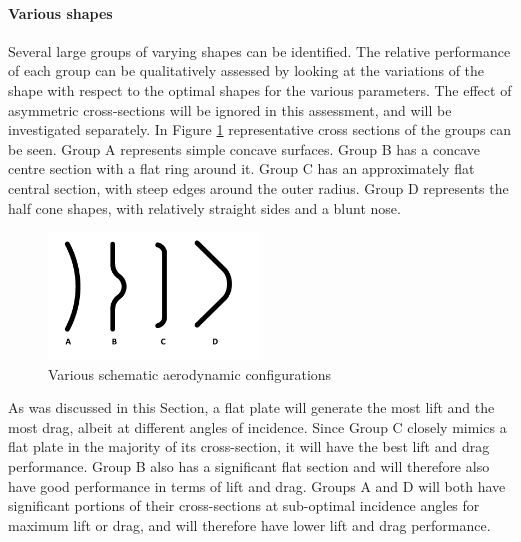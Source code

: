 \paragraph{Various shapes} \label{sec:aeroshapes}
Several large groups of varying shapes can be identified. The relative performance of each group can be qualitatively assessed by looking at the variations of the shape with respect to the optimal shapes for the various parameters. The effect of asymmetric cross-sections will be ignored in this assessment, and will be investigated separately. In Figure \ref{fig:aeroshapes} representative cross sections of the groups can be seen. Group A represents simple concave surfaces. Group B has a concave centre section with a flat ring around it. Group C has an approximately flat central section, with steep edges around the outer radius. Group D represents the half cone shapes, with relatively straight sides and a blunt nose. 

\begin{figure}[h]
	\centering
	\includegraphics[width=0.5\textwidth]{./Figure/Aerodynamics/AeroShapes.pdf}
	\caption{Various schematic aerodynamic configurations}
	\label{fig:aeroshapes}
\end{figure}

As was discussed in this Section, a flat plate will generate the most lift and the most drag, albeit at different angles of incidence. Since Group C closely mimics a flat plate in the majority of its cross-section, it will have the best lift and drag performance. Group B also has a significant flat section and will therefore also have good performance in terms of lift and drag. Groups A and D will both have significant portions of their cross-sections at sub-optimal incidence angles for maximum lift or drag, and will therefore have lower lift and drag performance.

